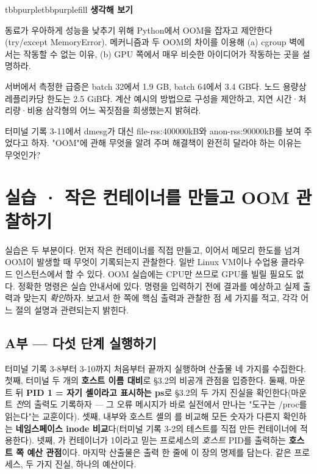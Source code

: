 \begin{calloutbox}{tbbpurple}{tbbpurplefill}
{\normalsize\bfseries\color{tbbpurple}생각해 보기}\par\vspace{3pt}
\begin{tbbitemize}
  \item 동료가 우아하게 성능을 낮추기 위해 Python에서 OOM을 잡자고 제안한다(try/except MemoryError). 메커니즘과 두 OOM의 차이를 이용해 (a) cgroup 벽에서는 작동할 수 없는 이유, (b) GPU 쪽에서 매우 비슷한 아이디어가 작동하는 곳을 설명하라.
  \item 서버에서 측정한 급증은 batch 32에서 1.9 GB, batch 64에서 3.4 GB다. 노드 용량상 레플리카당 한도는 2.5 GiB다. 계산 예시의 방법으로 구성을 제안하고, 지연 시간·처리량·비용 삼각형의 어느 꼭짓점을 희생했는지 밝혀라.
  \item 터미널 기록 3-11에서 dmesg가 대신 file-rss:400000kB와 anon-rss:90000kB를 보여 주었다고 하자. "OOM"에 관해 무엇을 알려 주며 해결책이 완전히 달라야 하는 이유는 무엇인가?
\end{tbbitemize}
\end{calloutbox}

\section{실습 · 작은 컨테이너를 만들고 OOM 관찰하기}

실습은 두 부분이다. 먼저 작은 컨테이너를 직접 만들고, 이어서 메모리 한도를 넘겨 OOM이 발생할 때 무엇이 기록되는지 관찰한다. 일반 Linux VM이나 수업용 클라우드 인스턴스에서 할 수 있다. OOM 실습에는 CPU만 쓰므로 GPU를 빌릴 필요도 없다. 정확한 명령은 실습 안내서에 있다. 명령을 입력하기 전에 결과를 예상하고 실제 출력과 맞는지 \textit{확인}하자. 보고서 한 쪽에 핵심 출력과 관찰한 점 세 가지를 적고, 각각 어느 절의 설명과 관련되는지 밝힌다.

\subsection*{A부 — 다섯 단계 실행하기}

터미널 기록 3-8부터 3-10까지 처음부터 끝까지 실행하며 산출물 네 가지를 수집한다. 첫째, 터미널 두 개의 \textbf{호스트 이름 대비}로 §3.2의 비공개 관점을 입증한다. 둘째,  마운트 뒤 \textbf{PID 1 = 자기 셸이라고 표시하는 ps}로 §3.2의 두 가지 진실을 확인한다(마운트 \textit{전}의  출력도 기록하자 — 그 오류 메시지가 바로 실전에서 만나는 "도구는 /proc를 읽는다"는 교훈이다). 셋째, 내부와 호스트 셸의 를 비교해 모든 숫자가 다른지 확인하는 \textbf{네임스페이스 inode 비교}다(터미널 기록 3-2의 테스트를 직접 만든 컨테이너에 적용한다). 넷째, 가 컨테이너가 1이라고 믿는 프로세스의 \textit{호스트} PID를 출력하는 \textbf{호스트 쪽 예산 관점}이다. 마지막 산출물은 출력 한 줄에 이 장의 명제를 담는다. 같은 프로세스, 두 가지 진실, 하나의 예산이다.

